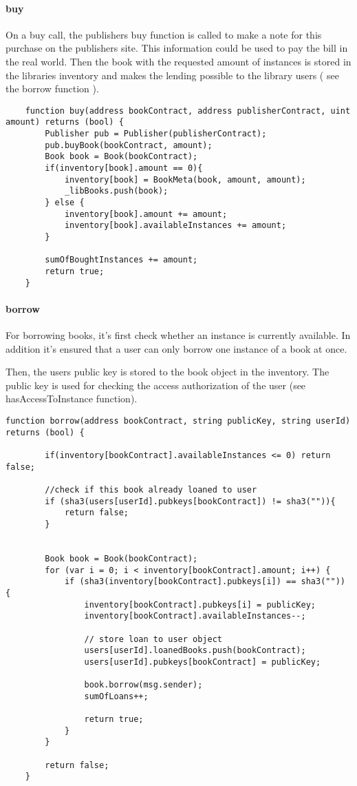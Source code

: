 \paragraph*{buy}
On a buy call, the publishers buy function is called to make a note for this purchase on the publishers site. This information could be used to pay the bill in the real world.
Then the book with the requested amount of instances is stored in the libraries inventory and makes the lending possible to the library users ( see the borrow function ).

\begin{lstlisting}
	function buy(address bookContract, address publisherContract, uint amount) returns (bool) {
		Publisher pub = Publisher(publisherContract);
		pub.buyBook(bookContract, amount);
        Book book = Book(bookContract);
        if(inventory[book].amount == 0){
            inventory[book] = BookMeta(book, amount, amount);
		    _libBooks.push(book);
		} else {
            inventory[book].amount += amount;
            inventory[book].availableInstances += amount;
		}

		sumOfBoughtInstances += amount;
		return true;
	}
\end{lstlisting}


\paragraph*{borrow \label{sssec:contractborrow}}
For borrowing books, it's first check whether an instance is currently available. In addition it's ensured that a user can only borrow one instance of a book at once.

Then, the users public key is stored to the book object in the inventory. The public key is used for checking the access authorization of the user (see hasAccessToInstance function).

\begin{lstlisting}
function borrow(address bookContract, string publicKey, string userId) returns (bool) {

		if(inventory[bookContract].availableInstances <= 0) return false;

		//check if this book already loaned to user
        if (sha3(users[userId].pubkeys[bookContract]) != sha3("")){
            return false;
        }


		Book book = Book(bookContract);
        for (var i = 0; i < inventory[bookContract].amount; i++) {
            if (sha3(inventory[bookContract].pubkeys[i]) == sha3("")) {
                inventory[bookContract].pubkeys[i] = publicKey;
                inventory[bookContract].availableInstances--;

                // store loan to user object
                users[userId].loanedBooks.push(bookContract);
                users[userId].pubkeys[bookContract] = publicKey;

                book.borrow(msg.sender);
                sumOfLoans++;

                return true;
            }
        }

        return false;
	}
\end{lstlisting}

